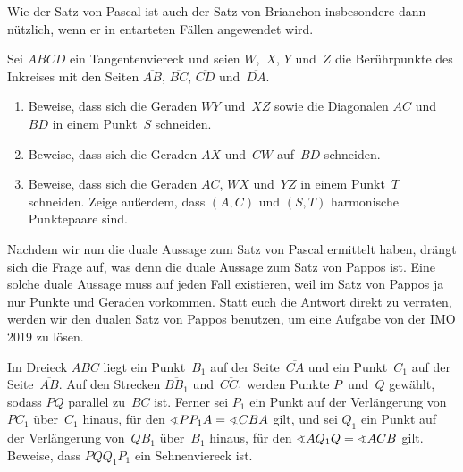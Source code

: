Wie der Satz von Pascal ist auch der Satz von Brianchon insbesondere dann nützlich, wenn er in entarteten Fällen angewendet wird.

\begin{aufgabe*}
	Sei $ABCD$ ein Tangentenviereck und seien $W$,~$X$, $Y$ und~$Z$ die Berührpunkte des Inkreises mit den Seiten $\overline{AB}$, $\overline{BC}$, $\overline{CD}$ und~$\overline{DA}$.
	\begin{enumerate}
		\item Beweise, dass sich die Geraden $WY$ und~$XZ$ sowie die Diagonalen $AC$ und~$BD$ in einem Punkt~$S$ schneiden.
		\item Beweise, dass sich die Geraden $AX$ und~$CW$ auf~$BD$ schneiden.
		\item Beweise, dass sich die Geraden $AC$, $WX$ und~$YZ$ in einem Punkt~$T$ schneiden. Zeige außerdem, dass $(A,C)$ und $(S,T)$ harmonische Punktepaare sind.
	\end{enumerate}
\end{aufgabe*}

Nachdem wir nun die duale Aussage zum Satz von Pascal ermittelt haben, drängt sich die Frage auf, was denn die duale Aussage zum Satz von Pappos ist. Eine solche duale Aussage muss auf jeden Fall existieren, weil im Satz von Pappos ja nur Punkte und Geraden vorkommen. Statt euch die Antwort direkt zu verraten, werden wir den dualen Satz von Pappos benutzen, um eine Aufgabe von der IMO 2019 zu lösen.

\begin{aufgabe*}[*]
	Im Dreieck $ABC$ liegt ein Punkt~$B_1$ auf der Seite~$\overline{CA}$ und ein Punkt~$C_1$ auf der Seite~$\overline{AB}$. Auf den Strecken $\overline{BB_1}$ und~$\overline{CC_1}$ werden Punkte $P$~und~$Q$ gewählt, sodass $PQ$ parallel zu~$BC$ ist. Ferner sei $P_1$ ein Punkt auf der Verlängerung von~$PC_1$ über~$C_1$ hinaus, für den $\winkel PP_1A=\winkel CBA$ gilt, und sei $Q_1$ ein Punkt auf der Verlängerung von~$QB_1$ über~$B_1$ hinaus, für den $\winkel AQ_1Q=\winkel ACB$ gilt. Beweise, dass $PQQ_1P_1$ ein Sehnenviereck ist.
\end{aufgabe*}

